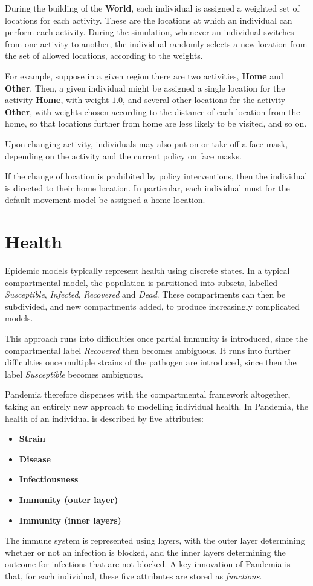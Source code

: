 \documentclass[10pt,letterpaper]{article}
\begin{document}
During the building of the \textbf{World}, each individual is assigned a weighted set of locations for each activity. These are the locations at which an individual can perform each activity. During the simulation, whenever an individual switches from one activity to another, the individual randomly selects a new location from the set of allowed locations, according to the weights.

For example, suppose in a given region there are two activities, \textbf{Home} and \textbf{Other}. Then, a given individual might be assigned a single location for the activity \textbf{Home}, with weight $1.0$, and several other locations for the activity \textbf{Other}, with weights chosen according to the distance of each location from the home, so that locations further from home are less likely to be visited, and so on.

Upon changing activity, individuals may also put on or take off a face mask, depending on the activity and the current policy on face masks.

If the change of location is prohibited by policy interventions, then the individual is directed to their home location. In particular, each individual must for the default movement model be assigned a home location.

\section{Health}
Epidemic models typically represent health using discrete states. In a typical compartmental model, the population is partitioned into subsets, labelled \textit{Susceptible}, \textit{Infected}, \textit{Recovered} and \textit{Dead}. These compartments can then be subdivided, and new compartments added, to produce increasingly complicated models.

This approach runs into difficulties once partial immunity is introduced, since the compartmental label \textit{Recovered} then becomes ambiguous. It runs into further difficulties once multiple strains of the pathogen are introduced, since then the label \textit{Susceptible} becomes ambiguous.

Pandemia therefore dispenses with the compartmental framework altogether, taking an entirely new approach to modelling individual health. In Pandemia, the health of an individual is described by five attributes:
\begin{itemize}
\item \textbf{Strain}
\item \textbf{Disease}
\item \textbf{Infectiousness}
\item \textbf{Immunity (outer layer)}
\item \textbf{Immunity (inner layers)}
\end{itemize}
The immune system is represented using layers, with the outer layer determining whether or not an infection is blocked, and the inner layers determining the outcome for infections that are not blocked. A key innovation of Pandemia is that, for each individual, these five attributes are stored as \textit{functions}.
\end{document}
